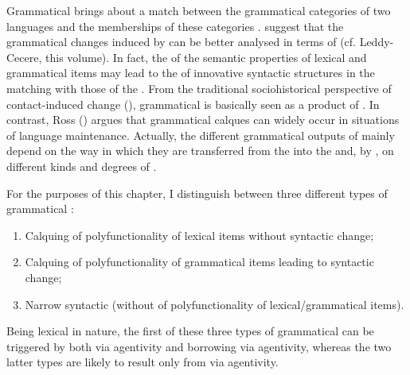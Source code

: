 \documentclass[output=paper]{langsci/langscibook}
\begin{document}
Grammatical  brings about a match between the grammatical categories of two languages and the memberships of these categories \citep[132]{Ross2007}. \citet{HeineKuteva2005} suggest that the grammatical changes induced by  can be better analysed in terms of  (cf. Leddy-Cecere, this volume). In fact, the  of the semantic properties of lexical and grammatical items may lead to the  of innovative syntactic structures in the  matching with those of the . From the traditional sociohistorical perspective of contact-induced change (\citealt{ThomasonKaufman1988}), grammatical  is basically seen as a product of . In contrast, Ross (\citeyear[131]{Ross2007}) argues that grammatical calques can widely occur in situations of language maintenance. Actually, the different grammatical outputs of  mainly depend on the way in which they are transferred from the  into the  and, by , on different kinds and degrees of .   

For the purposes of this chapter, I distinguish between three different types of grammatical : 

\begin{enumerate} 
\item Calquing of polyfunctionality of lexical items without syntactic change;
\item Calquing of polyfunctionality of grammatical items leading to syntactic change; 
\item Narrow syntactic  (without  of polyfunctionality of lexical/grammatical items).
\end{enumerate}

Being lexical in nature, the first of these three types of grammatical  can be triggered by both  via  agentivity and borrowing via  agentivity, whereas the two latter types are likely to result only from  via  agentivity. 
\end{document}
